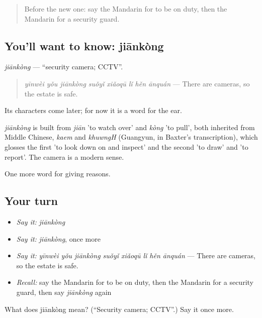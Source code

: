 \label{lesson:ZH-C382-jiankong}



\begin{quote}
Before the new one: say the Mandarin for to be on duty, then the Mandarin for a security guard.
\end{quote}

\subsection*{You'll want to know: jiānkòng}
\emph{jiānkòng} — \textquotedblleft{}security camera; CCTV\textquotedblright{}.

\begin{quote}
\emph{yīnwèi yǒu jiānkòng suǒyǐ xiǎoqū lǐ hěn ānquán} — There are cameras, so the estate is safe.
\end{quote}

Its characters come later; for now it is a word for the ear.

\begin{cousinweb}
\emph{jiānkòng} is built from \emph{jiān} 'to watch over' and \emph{kòng} 'to pull', both inherited from Middle Chinese, \emph{kaem} and \emph{khuwngH} (Guangyun, in Baxter's transcription), which glosses the first 'to look down on and inspect' and the second 'to draw' and 'to report'. The camera is a modern sense.
\end{cousinweb}

\begin{grammarlens}[title={What you've built}]
One more word for giving reasons.
\end{grammarlens}

\subsection*{Your turn}
\begin{itemize}
\raggedright
  \item \emph{Say it:} \emph{jiānkòng}
  \item \emph{Say it:} \emph{jiānkòng}, once more
  \item \emph{Say it:} \emph{yīnwèi yǒu jiānkòng suǒyǐ xiǎoqū lǐ hěn ānquán} — There are cameras, so the estate is safe.
  \item \emph{Recall:} say the Mandarin for to be on duty, then the Mandarin for a security guard, then say \emph{jiānkòng} again
\end{itemize}

\begin{tcolorbox}[breakable,colback=teal!4,colframe=teal!35!black,title={Before you move on}]
What does jiānkòng mean? (\textquotedblleft{}Security camera; CCTV\textquotedblright{}.) Say it once more.
\end{tcolorbox}
